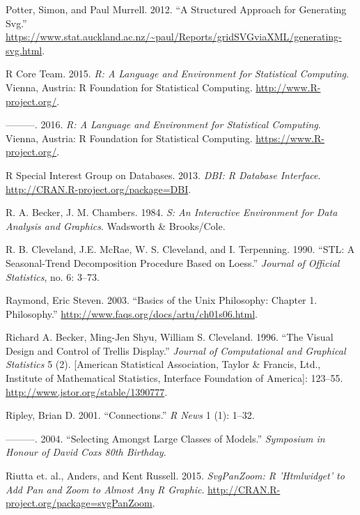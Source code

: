 \documentclass[12pt,]{isuthesis}
\begin{document}
\hypertarget{ref-gridSVGreport}{}
Potter, Simon, and Paul Murrell. 2012. ``A Structured Approach for
Generating Svg.''
\url{https://www.stat.auckland.ac.nz/~paul/Reports/gridSVGviaXML/generating-svg.html}.

\hypertarget{ref-RCore}{}
R Core Team. 2015. \emph{R: A Language and Environment for Statistical
Computing}. Vienna, Austria: R Foundation for Statistical Computing.
\url{http://www.R-project.org/}.

\hypertarget{ref-base}{}
---------. 2016. \emph{R: A Language and Environment for Statistical
Computing}. Vienna, Austria: R Foundation for Statistical Computing.
\url{https://www.R-project.org/}.

\hypertarget{ref-DBI}{}
R Special Interest Group on Databases. 2013. \emph{DBI: R Database
Interface}. \url{http://CRAN.R-project.org/package=DBI}.

\hypertarget{ref-S:1984}{}
R. A. Becker, J. M. Chambers. 1984. \emph{S: An Interactive Environment
for Data Analysis and Graphics}. Wadsworth \& Brooks/Cole.

\hypertarget{ref-stl}{}
R. B. Cleveland, J.E. McRae, W. S. Cleveland, and I. Terpenning. 1990.
``STL: A Seasonal-Trend Decomposition Procedure Based on Loess.''
\emph{Journal of Official Statistics}, no. 6: 3--73.

\hypertarget{ref-unix-philosophy}{}
Raymond, Eric Steven. 2003. ``Basics of the Unix Philosophy: Chapter 1.
Philosophy.'' \url{http://www.faqs.org/docs/artu/ch01s06.html}.

\hypertarget{ref-trellis}{}
Richard A. Becker, Ming-Jen Shyu, William S. Cleveland. 1996. ``The
Visual Design and Control of Trellis Display.'' \emph{Journal of
Computational and Graphical Statistics} 5 (2). {[}American Statistical
Association, Taylor \& Francis, Ltd., Institute of Mathematical
Statistics, Interface Foundation of America{]}: 123--55.
\url{http://www.jstor.org/stable/1390777}.

\hypertarget{ref-Connections}{}
Ripley, Brian D. 2001. ``Connections.'' \emph{R News} 1 (1): 1--32.

\hypertarget{ref-Ripley:2004}{}
---------. 2004. ``Selecting Amongst Large Classes of Models.''
\emph{Symposium in Honour of David Coxs 80th Birthday}.

\hypertarget{ref-svgPanZoom}{}
Riutta et. al., Anders, and Kent Russell. 2015. \emph{SvgPanZoom: R
'Htmlwidget' to Add Pan and Zoom to Almost Any R Graphic}.
\url{http://CRAN.R-project.org/package=svgPanZoom}.
\end{document}
